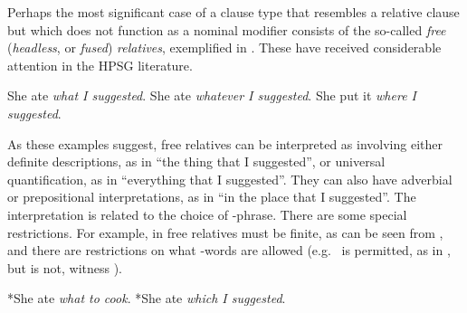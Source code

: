 \documentclass[output=paper,nonflat,draftmode]{./langsci/langscibook}
\begin{document}
Perhaps the most significant case of a clause type that resembles a relative clause but
which does not function as a nominal modifier consists of the so-called \emph{free}
(\emph{headless}, or \emph{fused}) \emph{relatives}, exemplified in . These
have received considerable attention in the HPSG literature.
\begin{exe}\ex\begin{xlist}\label{x:rc-137}
    \ex\label{x:rc-138} She ate \emph{what I suggested}.
    \ex\label{x:rc-139} She ate \emph{whatever I suggested}.
    \ex\label{x:rc-140} She put it \emph{where I suggested}.
\end{xlist}\end{exe}
As these examples suggest, free relatives can be interpreted as involving either definite
descriptions, as in  ``the thing that I suggested'', or universal
quantification, as in  ``everything that I suggested''. They can also have
adverbial or prepositional interpretations, as in  ``in the place that I
suggested''. The interpretation is related to the choice of -phrase.   There are some special
restrictions.  For example, in  free relatives must be finite, as can be seen
from , and there are restrictions on what -words are allowed (e.g.\
 is permitted, as in , but  is not, witness ).
\begin{exe}\ex\begin{xlist}\label{x:rc-141}
  \ex\label{x:rc-142} *She ate \emph{what to cook}.
  \ex\label{x:rc-143} *She ate \emph{which I suggested}.  
\end{xlist}\end{exe}
\end{document}
